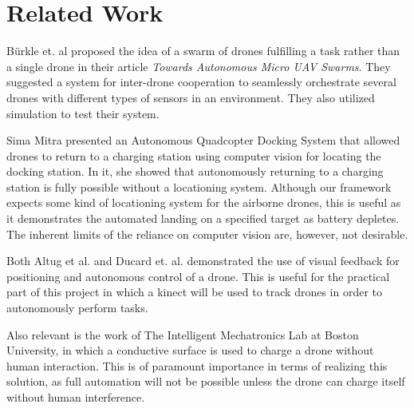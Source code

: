 \section{Related Work}
Bürkle et. al proposed the idea of a swarm of drones fulfilling a task rather than a single drone in their article \textit{Towards Autonomous Micro UAV Swarms}\cite{burkleetal}. They suggested a system for inter-drone cooperation to seamlessly orchestrate several drones with different types of sensors in an environment. They also utilized simulation to test their system.

Sima Mitra presented an Autonomous Quadcopter Docking System\cite{simamitra} that allowed drones to return to a charging station using computer vision for locating the docking station. In it, she showed that autonomously returning to a charging station is fully possible without a locationing system. Although our framework expects some kind of locationing system for the airborne drones, this is useful as it demonstrates the automated landing on a specified target as battery depletes. The inherent limits of the reliance on computer vision are, however, not desirable.

Both Altug et al.\cite{altugetal} and Ducard et. al.\cite{ducardetal} demonstrated the use of visual feedback for positioning and autonomous control of a drone. This is useful for the practical part of this project in which a kinect will be used to track drones in order to autonomously perform tasks.

Also relevant is the work of The Intelligent Mechatronics Lab at Boston University, in which a conductive surface is used to charge a drone without human interaction\cite{bostonuni}. This is of paramount importance in terms of realizing this solution, as full automation will not be possible unless the drone can charge itself without human interference.



